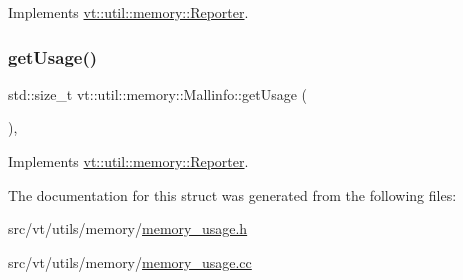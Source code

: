 Implements \hyperlink{structvt_1_1util_1_1memory_1_1_reporter_a83fc36e9cff3ce2deedf1d4546694713}{vt\+::util\+::memory\+::\+Reporter}.

\mbox{\label{structvt_1_1util_1_1memory_1_1_mallinfo_a872e568b6266e301844dbc252886794f}} 
\subsubsection{\texorpdfstring{get\+Usage()}{getUsage()}}
{\footnotesize\ttfamily std\+::size\+\_\+t vt\+::util\+::memory\+::\+Mallinfo\+::get\+Usage (\begin{DoxyParamCaption}{ }\end{DoxyParamCaption})\hspace{0.3cm}{\ttfamily [override]}, {\ttfamily [virtual]}}



Implements \hyperlink{structvt_1_1util_1_1memory_1_1_reporter_a372574f51fdb68077cd3d227ee373de5}{vt\+::util\+::memory\+::\+Reporter}.



The documentation for this struct was generated from the following files\+:\begin{DoxyCompactItemize}
\item 
src/vt/utils/memory/\hyperlink{memory__usage_8h}{memory\+\_\+usage.\+h}\item 
src/vt/utils/memory/\hyperlink{memory__usage_8cc}{memory\+\_\+usage.\+cc}\end{DoxyCompactItemize}
